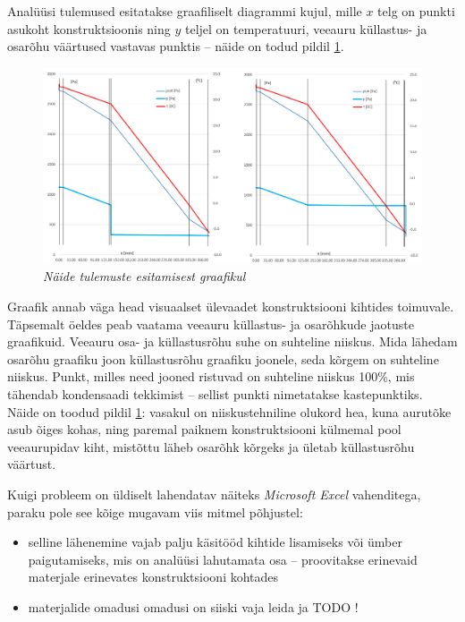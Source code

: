 Analüüsi tulemused esitatakse graafiliselt diagrammi kujul, mille \begin{math}x\end{math} telg on 
punkti asukoht konstruktsioonis ning \begin{math}y\end{math} teljel on temperatuuri, veeauru küllastus- ja
osarõhu väärtused vastavas punktis -- näide on todud pildil  \ref{fig:excel_graph_sample}.

\begin{figure}[ht]
    \centering
    \includegraphics[width=.8\textwidth]{figures/problem_statement/05_excel_grafic_sample.png}
    \caption{\textit{Näide tulemuste esitamisest graafikul}}
    \label{fig:excel_graph_sample}
\end{figure}

Graafik annab väga head visuaalset ülevaadet konstruktsiooni kihtides toimuvale. Täpsemalt öeldes peab vaatama 
veeauru küllastus- ja osarõhkude jaotuste graafikuid. Veeauru osa- ja küllastusrõhu suhe on suhteline niiskus. 
Mida lähedam osarõhu graafiku joon küllastusrõhu graafiku joonele, seda kõrgem on suhteline niiskus. Punkt, milles
need jooned ristuvad on suhteline niiskus 100\%, mis tähendab kondensaadi tekkimist --  sellist punkti nimetatakse kastepunktiks.
Näide on toodud pildil \ref{fig:excel_graph_sample}: vasakul on niiskustehniline olukord hea, kuna aurutõke asub õiges kohas, ning paremal
paiknem konstruktsiooni külmemal pool veeaurupidav kiht, mistõttu läheb osarõhk kõrgeks ja ületab küllastusrõhu väärtust.


Kuigi probleem on üldiselt lahendatav näiteks \textit{Microsoft Excel} vahenditega, paraku pole see kõige mugavam viis
mitmel põhjustel:
\begin{itemize}
    \item selline lähenemine vajab palju käsitööd kihtide lisamiseks või ümber paigutamiseks, mis on analüüsi lahutamata osa -- proovitakse erinevaid materjale erinevates konstruktsiooni kohtades
    \item materjalide omadusi omadusi on siiski vaja leida ja TODO !
\end{itemize}


